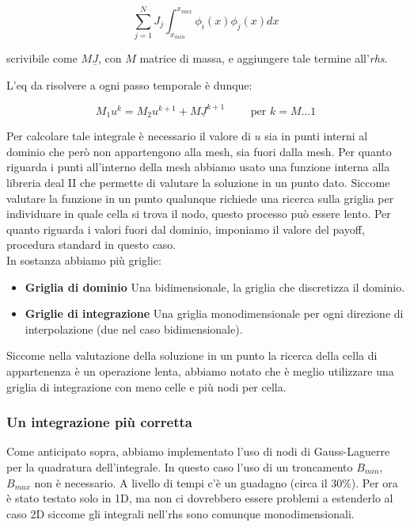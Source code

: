 \documentclass[a4paper,10pt]{article}
\begin{document}
\begin{equation*}
 \sum_{j=1}^N J_j\int_{x_{min}}^{x_{max}} \phi_i(x)\phi_j(x)dx
\end{equation*}

scrivibile come $M\underline{J}$, con $M$ matrice di massa, e aggiungere tale termine all'\emph{rhs}.

L'eq da risolvere a ogni passo temporale è dunque:

\begin{equation*}
 M_1u^k=M_2u^{k+1}+M\underline{J}^{k+1}  \qquad \text{ per } k=M\dots1
\end{equation*}


Per calcolare tale integrale è necessario il valore di $u$ sia in punti interni al dominio che per\`o non appartengono alla mesh, sia fuori dalla mesh. Per quanto riguarda i punti all'interno della mesh abbiamo usato una funzione interna alla libreria deal II che permette di valutare la soluzione in un punto dato. Siccome valutare la funzione in un punto qualunque richiede una ricerca sulla griglia per individuare in quale cella si trova il nodo, questo processo può essere lento. Per quanto riguarda i valori fuori dal dominio, imponiamo il valore del payoff, procedura standard in questo caso.\\

In sostanza abbiamo più griglie:
\begin{itemize}
 \item \textbf{Griglia di dominio} Una bidimensionale, la griglia che discretizza il dominio.
 \item \textbf{Griglie di integrazione} Una griglia monodimensionale per ogni direzione di interpolazione (due nel caso bidimensionale).
\end{itemize}

Siccome nella valutazione della soluzione in un punto la ricerca della cella di appartenenza è un operazione lenta, abbiamo notato che è meglio utilizzare una griglia di integrazione con meno celle e più nodi per cella.

\subsubsection{Un integrazione più corretta}
Come anticipato sopra, abbiamo implementato l'uso di nodi di Gauss-Laguerre per la quadratura dell'integrale. In questo caso l'uso di un troncamento $B_{min}$, $B_{max}$ non è necessario. A livello di tempi c'è un guadagno (circa il 30\%). Per ora \`e stato testato solo in 1D, ma non ci dovrebbero essere problemi a estenderlo al caso 2D siccome gli integrali nell'rhs sono comunque monodimensionali.
\end{document}
